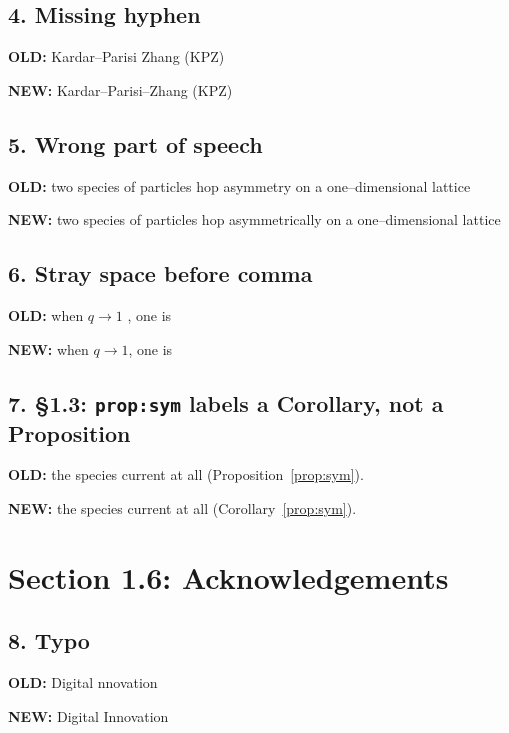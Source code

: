 \documentclass[11pt]{article}
\newenvironment{old}{\par\noindent\textcolor{oldred}{\textbf{OLD:}}\small\color{oldred}\verbatim}{\endverbatim\normalsize\color{black}}
\newenvironment{new}{\par\noindent\textcolor{newgreen}{\textbf{NEW:}}\small\color{newgreen}\verbatim}{\endverbatim\normalsize\color{black}}
\begin{document}
\subsection*{4. Missing hyphen}
\begin{old}
Kardar--Parisi Zhang (KPZ)
\end{old}
\begin{new}
Kardar--Parisi--Zhang (KPZ)
\end{new}

\subsection*{5. Wrong part of speech}
\begin{old}
two species of particles hop asymmetry on a one--dimensional lattice
\end{old}
\begin{new}
two species of particles hop asymmetrically on a one--dimensional lattice
\end{new}

\subsection*{6. Stray space before comma}
\begin{old}
when $q\rightarrow 1$ , one is
\end{old}
\begin{new}
when $q\rightarrow 1$, one is
\end{new}

\subsection*{7. \S1.3: \texttt{prop:sym} labels a Corollary, not a Proposition}
\begin{old}
the species current at all (Proposition~\ref{prop:sym}).
\end{old}
\begin{new}
the species current at all (Corollary~\ref{prop:sym}).
\end{new}

\section*{Section 1.6: Acknowledgements}

\subsection*{8. Typo}
\begin{old}
Digital nnovation
\end{old}
\begin{new}
Digital Innovation
\end{new}
\end{document}
